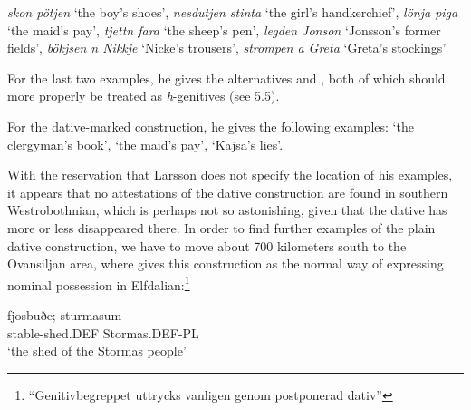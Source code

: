 

\textit{skon pötjen} ‘the boy’s shoes’, \textit{nesdutjen stinta} ‘the girl’s handkerchief’, \textit{lönja piga} ‘the maid’s pay’, \textit{tjettn fara} ‘the sheep’s pen’, \textit{legden Jonson} ‘Jonsson’s former fields’, \textit{bökjsen n Nikkje} ‘Nicke’s trousers’, \textit{strompen a Greta} ‘Greta’s stockings’


For the last two examples, he gives the alternatives  and , both of which should more properly be treated as \textit{h}{}-genitives (see 5.5).


For the dative-marked construction, he gives the following examples:  ‘the clergyman’s book’,  ‘the maid’s pay’, ‘Kajsa’s lies’. 


With the reservation that Larsson does not specify the location of his examples, it appears that no attestations of the dative construction are found in southern Westrobothnian, which is perhaps not so astonishing, given that the dative has more or less disappeared there. In order to find further examples of the plain dative construction, we have to move about 700 kilometers south to the Ovansiljan area, where \citet[97]{Levander1909} gives this construction as the normal way of expressing nominal possession in Elfdalian:\footnote{ “Genitivbegreppet uttrycks vanligen genom postponerad dativ”}


\ea\label{}
\gll fjosbuðe;  sturmasum\\
stable-shed.DEF  Stormas.DEF-PL\\
\glt ‘the shed of the Stormas people’
\z

